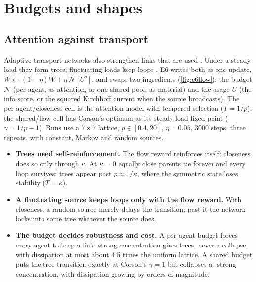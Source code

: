 \section{Budgets and shapes}\label{sec:structure}

\subsection{Attention against transport}
Adaptive transport networks also strengthen links that are used \citep{tero2010rules}. Under a steady load they form
trees; fluctuating loads keep loops \citep{katifori2010damage,corson2010fluctuations}. E6 writes both as one update,
$W\leftarrow(1-\eta)W+\eta\,\mathcal N[U^p]$, and swaps two ingredients (\cref{fig:e6flow}): the budget $\mathcal N$ (per
agent, as attention, or one shared pool, as material) and the usage $U$ (the info score, or the squared Kirchhoff current
when the source broadcasts). The per-agent/closeness cell is the attention model with tempered selection ($T=1/p$); the
shared/flow cell has Corson's optimum as its steady-load fixed point ($\gamma=1/p-1$). Runs use a $7\times7$ lattice,
$p\in[0.4,20]$, $\eta=0.05$, 3000 steps, three repeats, with constant, Markov and random sources.



\begin{itemize}
  \item \textbf{Trees need self-reinforcement.} The flow reward reinforces itself; closeness does so only through
    $\kappa$. At $\kappa=0$ equally close parents tie forever and every loop survives; trees appear past $p\approx1/\kappa$,
    where the symmetric state loses stability ($T=\kappa$).
  \item \textbf{A fluctuating source keeps loops only with the flow reward.} With closeness, a random source merely delays
    the transition; past it the network locks into some tree whatever the source does.
  \item \textbf{The budget decides robustness and cost.} A per-agent budget forces every agent to keep a link: strong
    concentration gives trees, never a collapse, with dissipation at most about 4.5 times the uniform lattice. A shared
    budget puts the tree transition exactly at Corson's $\gamma=1$ but collapses at strong concentration, with dissipation
    growing by orders of magnitude.
\end{itemize}

